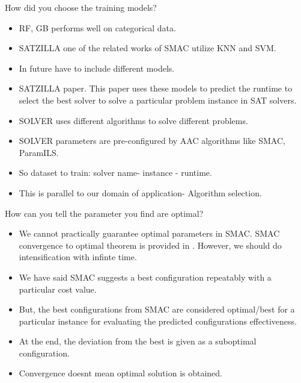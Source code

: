 \documentclass[10pt]{beamer}
\begin{document}
\begin{frame}[t]{How did you choose the training models?}
\begin{itemize}
\item RF, GB performs well on categorical data.

\item SATZILLA \cite{SATZILLA} one of the related works of SMAC utilize KNN and SVM.

\item In future have to include different models. 

\item SATZILLA paper. This paper uses these models to predict the runtime to select the best solver to solve a particular problem instance in SAT solvers.

\item SOLVER uses different algorithms to solve different problems.

\item SOLVER parameters are pre-configured by AAC algorithms like SMAC, ParamILS.

\item So dataset to train: solver name- instance - runtime. 

\item This is parallel to our domain of application- Algorithm selection.
	
\end{itemize}
\end{frame}{}

\begin{frame}[t]{How can you tell the parameter you find are optimal?}

\begin{itemize}
\item We cannot practically guarantee optimal parameters in SMAC. SMAC convergence to optimal theorem is provided in \cite{SMAC_extendedpaper}. However, we should do intensification with infinte time.

\item We have said SMAC suggests a best configuration repeatably with a particular cost value.

\item But, the best configurations from SMAC are considered optimal/best for a particular instance for evaluating the predicted configurations effectiveness.

\item At the end, the deviation from the best is given as a suboptimal configuration.

\item Convergence doesnt mean optimal solution is obtained.

\end{itemize}
\end{frame}
\end{document}
